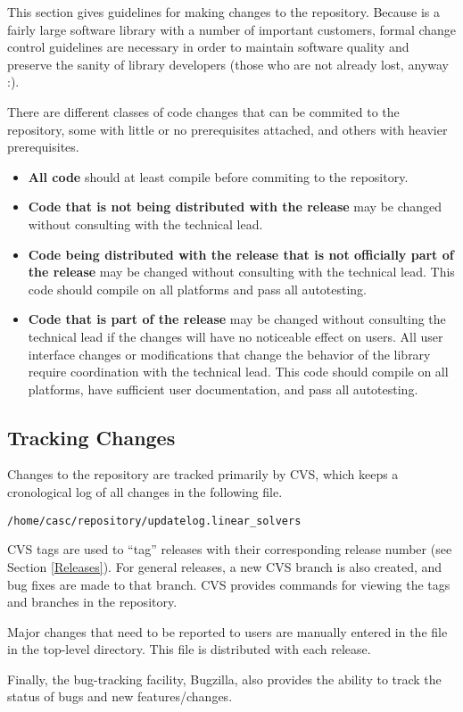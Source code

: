 This section gives guidelines for making changes to the repository.
Because \hypre{} is a fairly large software library with a number of
important customers, formal change control guidelines are necessary in
order to maintain software quality and preserve the sanity of library
developers (those who are not already lost, anyway :).

There are different classes of code changes that can be commited to
the repository, some with little or no prerequisites attached, and
others with heavier prerequisites.
\begin{itemize}

\item {\bf All code} should at least compile before commiting
to the repository.

\item {\bf Code that is not being distributed with the release}
may be changed without consulting with the \hypre{} technical lead.

\item {\bf Code being distributed with the release that is not officially
part of the release} may be changed without consulting with the
\hypre{} technical lead.  This code should compile on all platforms
and pass all autotesting.

\item {\bf Code that is part of the release} may be changed without
consulting the \hypre{} technical lead if the changes will have no
noticeable effect on users.  All user interface changes or
modifications that change the behavior of the library require
coordination with the \hypre{} technical lead.  This code should
compile on all platforms, have sufficient user documentation, and pass
all autotesting.

\end{itemize}


\subsection{Tracking Changes}
\label{Tracking Changes}

Changes to the repository are tracked primarily by CVS, which keeps a
cronological log of all changes in the following file.
\begin{verbatim}
/home/casc/repository/updatelog.linear_solvers
\end{verbatim}

CVS tags are used to ``tag'' releases with their corresponding release
number (see Section \ref{Releases}).  For general releases, a new CVS
branch is also created, and bug fixes are made to that branch.  CVS
provides commands for viewing the tags and branches in the repository.

Major changes that need to be reported to users are manually entered
in the  file in the top-level directory.  This file is
distributed with each \hypre{} release.

Finally, the \hypre{} bug-tracking facility, Bugzilla, also provides
the ability to track the status of bugs and new features/changes.
